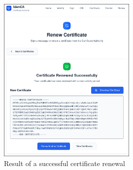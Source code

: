 \begin{figure}[h!]
    \centering
    \includegraphics[keepaspectratio, width=0.6\textwidth]{Pic/7_renewed_certificate.png}
    \caption{Result of a successful certificate renewal}
    \label{fig:successful-renewal}
\end{figure}

